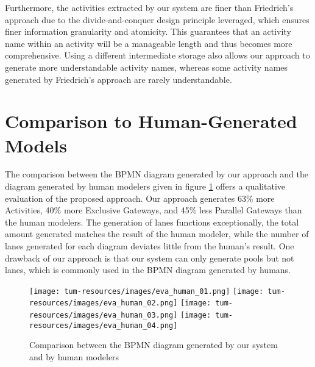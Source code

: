 Furthermore, the activities extracted by our system are finer than Friedrich's approach due to the divide-and-conquer design principle leveraged, which ensures finer information granularity and atomicity. This guarantees that an activity name within an activity will be a manageable length and thus becomes more comprehensive. Using a different intermediate storage also allows our approach to generate more understandable activity names, whereas some activity names generated by Friedrich's approach are rarely understandable.

\section{Comparison to Human-Generated Models}
The comparison between the BPMN diagram generated by our approach and the diagram generated by human modelers given in figure \ref{img:eva_comp_human} offers a qualitative evaluation of the proposed approach. Our approach generates 63\% more Activities, 40\% more Exclusive Gateways, and 45\% less Parallel Gateways than the human modelers. The generation of lanes functions exceptionally, the total amount generated matches the result of the human modeler, while the number of lanes generated for each diagram deviates little from the human's result. One drawback of our approach is that our system can only generate pools but not lanes, which is commonly used in the BPMN diagram generated by humans. 

\begin{figure}[h]
    \centering
    \caption{Comparison between the BPMN diagram generated by our system and by human modelers}
    \label{img:eva_comp_human}
    \texttt{[image: tum-resources/images/eva\_human\_01.png]}
    \hspace{1in}
    \texttt{[image: tum-resources/images/eva\_human\_02.png]}
    \hspace{1in}
    \texttt{[image: tum-resources/images/eva\_human\_03.png]}
    \hspace{1in}
    \texttt{[image: tum-resources/images/eva\_human\_04.png]}
\end{figure}


